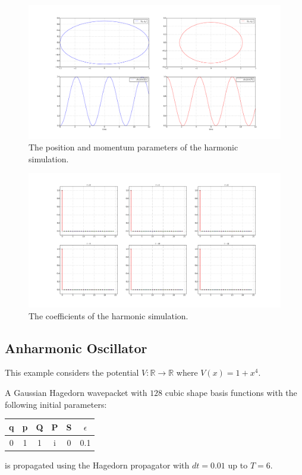 \begin{figure}[!ht]
\includegraphics[width=\textwidth]{Figures/harmonic_params.pdf}
\caption{The position and momentum parameters of the harmonic simulation.}
\label{fig:harmonic_params}
\end{figure}
\begin{figure}[!ht]
\includegraphics[width=\textwidth]{Figures/harmonic_coeffs.pdf}
\caption{The coefficients of the harmonic simulation.}
\label{fig:harmonic_coeffs}
\end{figure}

\FloatBarrier


\subsection{Anharmonic Oscillator}
This example considers the potential $V: \mathbb{R} \rightarrow \mathbb{R}$ where $V(x) = 1 + x^4$.

A Gaussian Hagedorn wavepacket\cite{H_ladder_operators} with $128$ cubic shape basis functions with the following initial parameters:
\begin{center}
 \begin{tabular}{|c c c c c c|} 
 \hline
 q & p & Q & P & S & $\epsilon$\\ [0.5ex] 
 \hline
 0 & 1 & 1 & i & 0 & 0.1\\ 
 \hline
\end{tabular}
\end{center}
is propagated using the Hagedorn propagator with $dt = 0.01$ up to $T = 6$.

